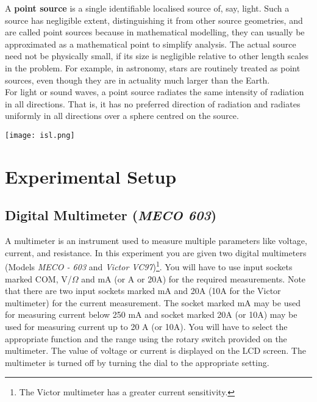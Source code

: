 \begin{minipage}{0.5\linewidth}
A \textbf{point source} is a single identifiable localised source of, say, light. Such a source has negligible extent, distinguishing it from other source geometries, and are called point sources because in mathematical modelling, they can usually be approximated as a mathematical point to simplify analysis. The actual source need not be physically small, if its size is negligible relative to other length scales in the problem. For example, in astronomy, stars are routinely treated as point sources, even though they are in actuality much larger than the Earth.~\\

For light or sound waves, a point source radiates the same intensity of radiation in all directions. That is, it has no preferred direction of radiation and radiates uniformly in all directions over a sphere centred on the source.
\end{minipage}
\begin{minipage}{0.5\linewidth}
\centering
\texttt{[image: isl.png]}
\end{minipage}



\section*{Experimental Setup}

\subsection*{Digital Multimeter (\textit{MECO 603})}

A multimeter is an instrument used to measure multiple parameters like voltage, current, and resistance. In this experiment you are given two digital multimeters (Models \textit{MECO - 603} and \textit{Victor VC97})\footnote{The Victor multimeter has a greater current sensitivity.}. You will have to use input sockets marked COM, V/$\Omega$ and mA (or A or 20A) for the required measurements. Note that there are two input sockets marked mA and 20A (10A for the Victor multimeter) for the current measurement. The socket marked mA may be used for measuring current below 250 mA and socket marked 20A (or 10A) may be used for measuring current up to 20 A (or 10A). You will have to select the appropriate function and the range using the rotary switch provided on the multimeter. The value of voltage or current is displayed on the LCD screen. The multimeter is turned off by turning the dial to the appropriate setting.


